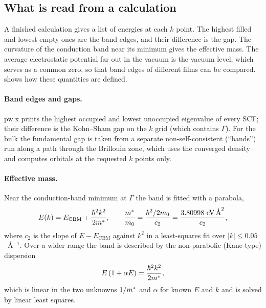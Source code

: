 \subsection{What is read from a calculation}
\label{sec:dft-readout}

\begin{dftplain}
A finished calculation gives a list of energies at each $k$ point. The highest filled and lowest empty ones are the
band edges, and their difference is the gap. The curvature of the conduction band near its minimum gives the effective
mass. The average electrostatic potential far out in the vacuum is the vacuum level, which serves as a common zero, so
that band edges of different films can be compared.  shows how these quantities are defined.
\end{dftplain}

\paragraph{Band edges and gaps.} pw.x prints the highest occupied and lowest unoccupied eigenvalue of every SCF; their
difference is the Kohn--Sham gap on the $k$ grid (which contains $\Gamma$). For the bulk the fundamental gap is taken
from a separate non-self-consistent (``bands'') run along a path through the Brillouin zone, which uses the converged
density and computes orbitals at the requested $k$ points only.

\paragraph{Effective mass.} Near the conduction-band minimum at $\Gamma$ the band is fitted with a parabola,
\begin{equation}
E(k) = E_{\mathrm{CBM}} + \frac{\hbar^2 k^2}{2m^{*}} , \qquad
\frac{m^{*}}{m_0} = \frac{\hbar^2/2m_0}{c_2} = \frac{3.80998~\mathrm{eV}\,\text{\AA}^{2}}{c_2} ,
\label{eq:dft-mass}
\end{equation}
where $c_2$ is the slope of $E - E_{\mathrm{CBM}}$ against $k^2$ in a least-squares fit over $|k| \le 0.05$~\AA$^{-1}$.
Over a wider range the band is described by the non-parabolic (Kane-type) dispersion \citep{Kane1957}
\begin{equation}
E\,(1 + \alpha E) = \frac{\hbar^2 k^2}{2m^{*}} ,
\label{eq:dft-kane}
\end{equation}
which is linear in the two unknowns $1/m^{*}$ and $\alpha$ for known $E$ and $k$ and is solved by linear least squares.


